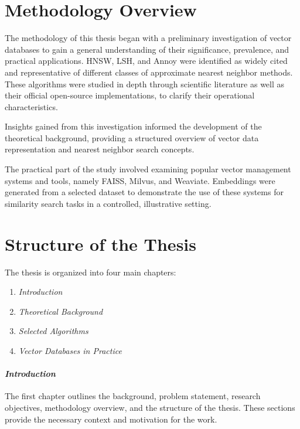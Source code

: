 \section{Methodology Overview}

The methodology of this thesis began with a preliminary investigation of vector databases to gain a general understanding of their significance, prevalence, and practical applications. HNSW, LSH, and Annoy were identified as widely cited and representative of different classes of approximate nearest neighbor methods. These algorithms were studied in depth through scientific literature as well as their official open-source implementations, to clarify their operational characteristics.

Insights gained from this investigation informed the development of the theoretical background, providing a structured overview of vector data representation and nearest neighbor search concepts.

The practical part of the study involved examining popular vector management systems and tools, namely FAISS, Milvus, and Weaviate. Embeddings were generated from a selected dataset to demonstrate the use of these systems for similarity search tasks in a controlled, illustrative setting.

\section{Structure of the Thesis}

The thesis is organized into four main chapters:

\begin{enumerate}
    \item \textit{Introduction}
    \item \textit{Theoretical Background}
    \item \textit{Selected Algorithms}
    \item \textit{Vector Databases in Practice}
\end{enumerate}

\paragraph{\textit{Introduction}}

The first chapter outlines the background, problem statement, research objectives, methodology overview, and the structure of the thesis. These sections provide the necessary context and motivation for the work.

